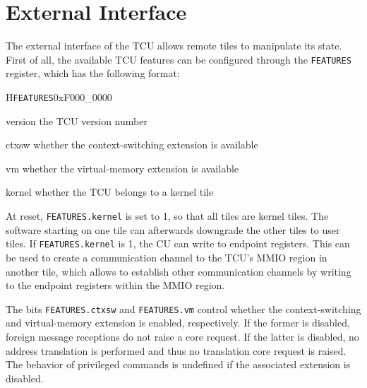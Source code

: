 \chapter{External Interface}

The external interface of the TCU allows remote tiles to manipulate its state. First of all, the
available TCU features can be configured through the \texttt{FEATURES} register, which has the
following format:

\setlength{\regWidth}{.95\textwidth}
\begin{register}{H}{\texttt{FEATURES}}{0xF000\_0000}
  \regnewline%
  \begin{regdesc}\begin{reglist}
    \item[version] the TCU version number
    \item[ctxsw] whether the context-switching extension is available
    \item[vm] whether the virtual-memory extension is available
    \item[kernel] whether the TCU belongs to a kernel tile
  \end{reglist}\end{regdesc}
\end{register}
\setlength{\regWidth}{\textwidth}

\noindent At reset, \texttt{FEATURES.kernel} is set to 1, so that all tiles are kernel tiles. The
software starting on one tile can afterwards downgrade the other tiles to user tiles. If
\texttt{FEATURES.kernel} is 1, the CU can write to endpoint registers. This can be used to create a
communication channel to the TCU's MMIO region in another tile, which allows to establish other
communication channels by writing to the endpoint registers within the MMIO region.

The bits \texttt{FEATURES.ctxsw} and \texttt{FEATURES.vm} control whether the context-switching and
virtual-memory extension is enabled, respectively. If the former is disabled, foreign message
receptions do not raise a core request. If the latter is disabled, no address translation is
performed and thus no translation core request is raised. The behavior of privileged commands is
undefined if the associated extension is disabled.

